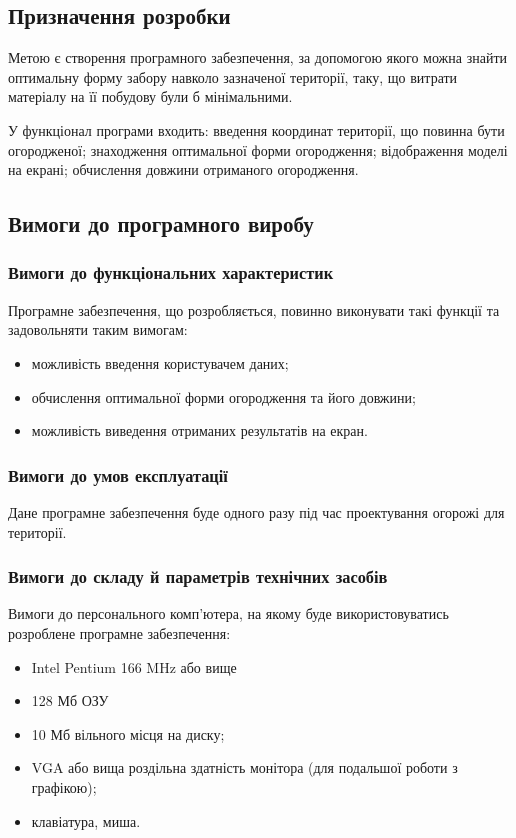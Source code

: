 \documentclass[simple,14pt,utf8,ukrainian]{eskdtext}
\begin{document}
  \subsection*{Призначення розробки}
    Метою є створення програмного забезпечення, за допомогою якого можна
    знайти оптимальну форму забору навколо зазначеної території, таку, що
    витрати матеріалу на її побудову були б мінімальними.

    У функціонал програми входить: введення координат території, що повинна
    бути огородженої; знаходження оптимальної форми огородження; відображення
    моделі на екрані; обчислення довжини отриманого огородження.

  \subsection*{Вимоги до програмного виробу}
    \subsubsection*{Вимоги до функціональних характеристик}
        Програмне забезпечення, що розробляється, повинно виконувати такі
        функції та задовольняти таким вимогам:
        \begin{itemize}
            \item можливість введення користувачем даних;
            \item обчислення оптимальної форми огородження та його довжини;
            \item можливість виведення отриманих результатів на екран.
        \end{itemize}

    \subsubsection*{Вимоги до умов експлуатації}
        Дане програмне забезпечення буде одного разу під час проектування
        огорожі для території.

    \subsubsection*{Вимоги до складу й параметрів технічних засобів}
        Вимоги до персонального комп’ютера, на якому буде використовуватись
        розроблене програмне забезпечення:
        \begin{itemize}
            \item Intel Pentium 166 MHz або вище
            \item 128 Мб ОЗУ
            \item 10 Мб вільного місця на диску;
            \item VGA або вища роздільна здатність монітора (для подальшої
                роботи з графікою);
            \item клавіатура, миша.
        \end{itemize}
\end{document}
